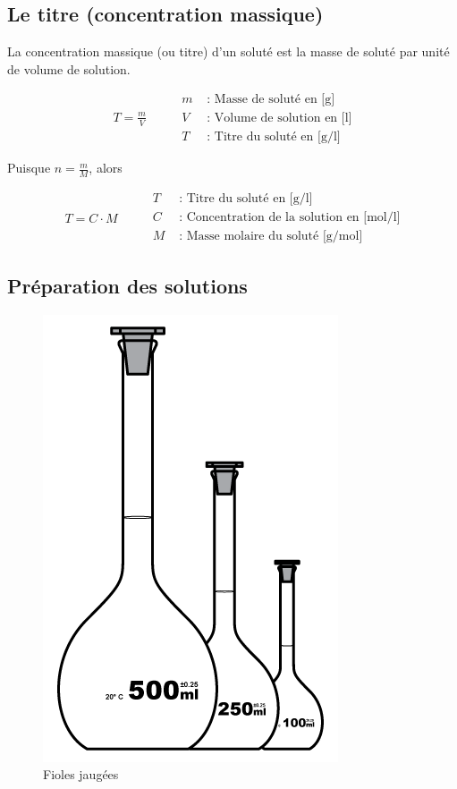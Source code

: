 \documentclass[
  11pt,
  a4paper,
  openany]{book}
\begin{document}
\hypertarget{le-titre-concentration-massique}{%
\subsection{Le titre (concentration massique)}\label{le-titre-concentration-massique}}

La concentration massique (ou titre) d'un soluté est la masse de soluté par unité de volume de solution.

\[
\begin{split}
  T = \frac{m}{V}
\end{split}
\qquad
\begin{split}
  m &\text{ : Masse de soluté en [g]} \\
  V &\text{ : Volume de solution en [l]} \\
  T &\text{ : Titre du soluté en [g/l]}
\end{split}
\]

Puisque \(n = \frac{m}{M}\), alors

\[
\begin{split}
  T = C \cdot M
\end{split}
\qquad
\begin{split}
  T &\text{ : Titre du soluté en [g/l]} \\
  C &\text{ : Concentration de la solution en [mol/l]} \\
  M &\text{ : Masse molaire du soluté [g/mol]}
\end{split}
\]

\hypertarget{pruxe9paration-des-solutions}{%
\subsection{Préparation des solutions}\label{pruxe9paration-des-solutions}}

\begin{figure}

{\centering \includegraphics[width=0.2\linewidth]{images/fiole} 

}

\caption{Fioles jaugées}\label{fig:fiole}
\end{figure}
\end{document}
